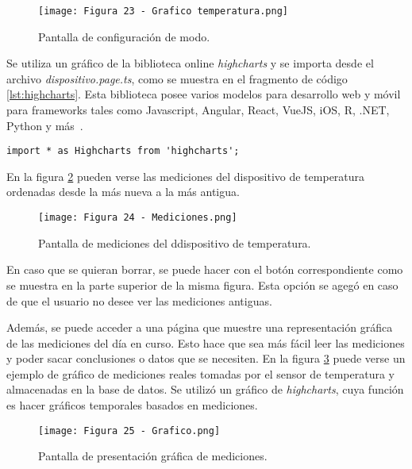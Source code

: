 \begin{figure}[h]
\centering
\texttt{[image: Figura 23 - Grafico temperatura.png]}
\caption[Pantalla de configuración de modo]{Pantalla de configuración de modo.}
\label{fig:23}
\end{figure}

Se utiliza un gráfico de la biblioteca online \textit{highcharts} y se importa desde el archivo \textit{dispositivo.page.ts}, como se muestra en el fragmento de código \ref{lst:highcharts}. Esta biblioteca posee varios modelos para desarrollo web y móvil para frameworks tales como Javascript, Angular, React, VueJS, iOS, R, .NET, Python y más\ \citep{33}.

\begin{lstlisting}[caption={Importación de gráfico de \textit{highcharts}.}, label={lst:highcharts}]
import * as Highcharts from 'highcharts';
\end{lstlisting}

En la figura \ref{fig:24} pueden verse las mediciones del dispositivo de temperatura ordenadas desde la más nueva a la más antigua.

\begin{figure}[h]
\centering
\texttt{[image: Figura 24 - Mediciones.png]}
\caption[Pantalla de mediciones del ddispositivo de temperatura]{Pantalla de mediciones del ddispositivo de temperatura.}
\label{fig:24}
\end{figure}

En caso que se quieran borrar, se puede hacer con el botón correspondiente como se muestra en la parte superior de la misma figura. Esta opción se agegó en caso de que el usuario no desee ver las mediciones antiguas.

Además, se puede acceder a una página que muestre una representación gráfica de las mediciones del día en curso. Esto hace que sea más fácil leer las mediciones y poder sacar conclusiones o datos que se necesiten. En la figura \ref{fig:25} puede verse un ejemplo de gráfico de mediciones reales tomadas por el sensor de temperatura y almacenadas en la base de datos. Se utilizó un gráfico de \textit{highcharts}, cuya función es hacer gráficos temporales basados en mediciones.

\begin{figure}[h]
\centering
\texttt{[image: Figura 25 - Grafico.png]}
\caption[Pantalla de presentación gráfica de mediciones]{Pantalla de presentación gráfica de mediciones.}
\label{fig:25}
\end{figure}

